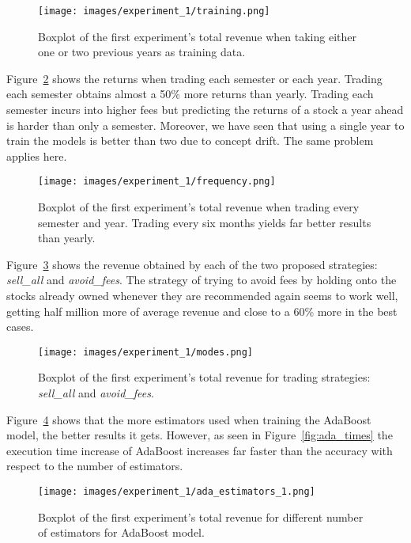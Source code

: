 \begin{figure}
    \centering
    \texttt{[image: images/experiment\_1/training.png]}
    \caption{\small Boxplot of the first experiment's total revenue when taking either one or two previous years as training data.}
    \label{fig:exp1_box_training_returns}
\end{figure}

Figure~\ref{fig:exp1_box_freq1_returns} shows the returns when trading each semester or each year. Trading each semester obtains almost a 50\% more returns than yearly. Trading each semester incurs into higher fees but predicting the returns of a stock a year ahead is harder than only a semester. Moreover, we have seen that using a single year to train the models is better than two due to concept drift. The same problem applies here.

\begin{figure}
    \centering
    \texttt{[image: images/experiment\_1/frequency.png]}
    \caption{\small Boxplot of the first experiment's total revenue when trading every semester and year. Trading every six months yields far better results than yearly.}
    \label{fig:exp1_box_freq1_returns}
 \end{figure}
 

Figure~\ref{fig:exp1_box_mode_returns} shows the revenue obtained by each of the two proposed strategies: \textit{sell\_all} and \textit{avoid\_fees}. The strategy of trying to avoid fees by holding onto the stocks already owned whenever they are recommended again seems to work well, getting half million more of average revenue and close to a 60\% more in the best cases.

\begin{figure}
    \centering
    \texttt{[image: images/experiment\_1/modes.png]}
    \caption{\small Boxplot of the first experiment's total revenue for trading strategies: \textit{sell\_all} and \textit{avoid\_fees}. }
    \label{fig:exp1_box_mode_returns}
\end{figure}


Figure~\ref{fig:exp1_box_ada_estimators} shows that the more estimators used when training the AdaBoost model, the better results it gets. However, as seen in Figure~\ref{fig:ada_times} the execution time increase of AdaBoost increases far faster than the accuracy with respect to the number of estimators. %


\begin{figure}
    \centering
    \texttt{[image: images/experiment\_1/ada\_estimators\_1.png]}
    \caption{\small Boxplot of the first experiment's total revenue for different number of estimators for AdaBoost model.}
    \label{fig:exp1_box_ada_estimators}
\end{figure}

